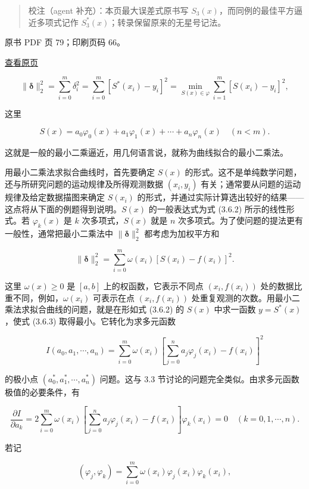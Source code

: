 \begin{quote}
校注（agent 补充）：本页最大误差式原书写 \(S_3(x)\)，而同例的最佳平方逼近多项式记作 \(S_3^*(x)\)；转录保留原来的无星号记法。
\end{quote}

\clearpage

原书 PDF 页 79；印刷页码 66。

\href{source-images/pdf-079.jpeg}{查看原页}

\[
\|\boldsymbol\delta\|_2^2=\sum_{i=0}^m\delta_i^2=\sum_{i=0}^m[S^*(x_i)-y_i]^2=\min_{S(x)\in\varphi}\sum_{i=1}^m[S(x_i)-y_i]^2,\tag{3.6.1}
\]

这里

\[
S(x)=a_0\varphi_0(x)+a_1\varphi_1(x)+\cdots+a_n\varphi_n(x)\quad(n<m).\tag{3.6.2}
\]

这就是一般的最小二乘逼近，用几何语言说，就称为曲线拟合的最小二乘法。

用最小二乘法求拟合曲线时，首先要确定 \(S(x)\) 的形式。这不是单纯数学问题，还与所研究问题的运动规律及所得观测数据 \((x_i,y_i)\) 有关；通常要从问题的运动规律及给定数据描图来确定 \(S(x_i)\) 的形式，并通过实际计算选出较好的结果------这点将从下面的例题得到说明。\(S(x)\) 的一般表达式为式 (3.6.2) 所示的线性形式。若 \(\varphi_k(x)\) 是 \(k\) 次多项式，\(S(x)\) 就是 \(n\) 次多项式。为了使问题的提法更有一般性，通常把最小二乘法中 \(\|\boldsymbol\delta\|_2^2\) 都考虑为加权平方和

\[
\|\boldsymbol\delta\|_2^2=\sum_{i=0}^m\omega(x_i)[S(x_i)-f(x_i)]^2.\tag{3.6.3}
\]

这里 \(\omega(x)\geqslant0\) 是 \([a,b]\) 上的权函数，它表示不同点 \((x_i,f(x_i))\) 处的数据比重不同，例如，\(\omega(x_i)\) 可表示在点 \((x_i,f(x_i))\) 处重复观测的次数。用最小二乘法求拟合曲线的问题，就是在形如式 (3.6.2) 的 \(S(x)\) 中求一函数 \(y=S^*(x)\)，使式 (3.6.3) 取得最小。它转化为求多元函数

\[
I(a_0,a_1,\cdots,a_n)=\sum_{i=0}^m\omega(x_i)\left[\sum_{j=0}^na_j\varphi_j(x_i)-f(x_i)\right]^2\tag{3.6.4}
\]

的极小点 \((a_0^*,a_1^*,\cdots,a_n^*)\) 问题。这与 3.3 节讨论的问题完全类似。由求多元函数极值的必要条件，有

\[
\frac{\partial I}{\partial a_k}=2\sum_{i=0}^m\omega(x_i)\left[\sum_{j=0}^na_j\varphi_j(x_i)-f(x_i)\right]\varphi_k(x_i)=0\quad(k=0,1,\cdots,n).
\]

若记

\[
(\varphi_j,\varphi_k)=\sum_{i=0}^m\omega(x_i)\varphi_j(x_i)\varphi_k(x_i),\tag{3.6.5}
\]

